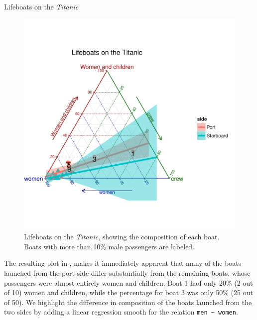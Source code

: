 \documentclass[11pt]{book}\usepackage[]{graphicx}\usepackage[]{color}
\newenvironment{knitrout}{}{} %
\renewenvironment{knitrout}{\small\renewcommand{\baselinestretch}{.85}}{} %
\begin{document}
\begin{Example}[lifeboat1]{Lifeboats on the \emph{Titanic}}
\begin{knitrout}
\begin{figure}[htbp]
\centerline{\includegraphics[width=.7\textwidth,clip]{ch04/fig/lifeboats1} }

\caption[Lifeboats on the Titanic]{Lifeboats on the \emph{Titanic}, showing the composition of each boat.  Boats with more than 10\% male passengers are labeled.\label{fig:lifeboats1}}
\end{figure}


\end{knitrout}

The resulting plot in , makes it immediately apparent
that many of the boats launched from the port side differ substantially
from the remaining boats, whose passengers were almost entirely women
and children.  Boat 1 had only 20\% (2 out of 10) women and children, while the percentage for boat 3 was only 50\% (25 out of 50). We highlight the difference in 
composition of the boats launched from the two sides by adding a linear regression
smooth for the relation \verb|men ~ women|.


\end{Example}
\end{document}
